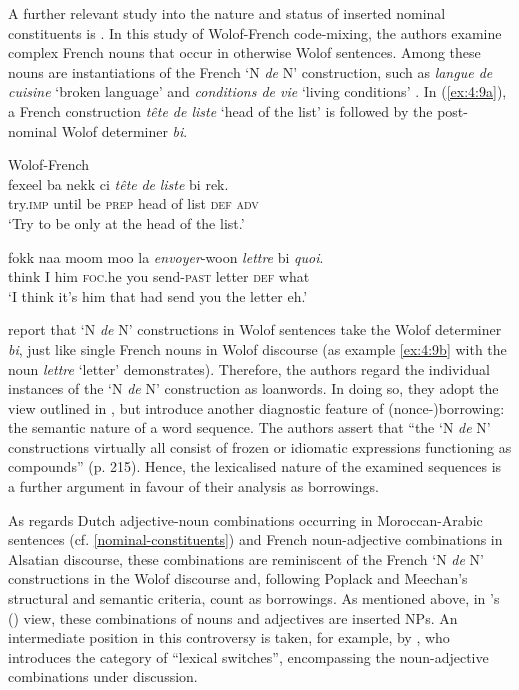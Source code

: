 A further relevant study into the nature and status of inserted nominal constituents is \citet{poplack-meechan-1995}. In this study of Wolof-French code-mixing, the authors examine complex French nouns that occur in otherwise Wolof sentences. Among these nouns are instantiations of the French `N \textit{de} N' construction, such as \textit{langue de cuisine} `broken language' and \textit{conditions de vie} `living conditions' \citep[215]{poplack-meechan-1995}. In (\ref{ex:4:9a}), a French construction \textit{tête de liste} `head of the list' is followed by the post-nominal Wolof determiner \textit{bi}.

\ea Wolof-French \citep[215, 228]{poplack-meechan-1995}\\

\ea{\label{ex:4:9a}}
\gll fexeel ba nekk ci \textit{tête} \textit{de} \textit{liste} bi rek.\\
	try.\textsc{imp} until be \textsc{prep} head of list \textsc{def} \textsc{adv}\\
\glt `Try to be only at the head of the list.' 

\ex{\label{ex:4:9b}}
\gll fokk naa moom moo la \textit{envoyer}-woon \textit{lettre} bi \textit{quoi}.\\
	think I him \textsc{foc}.he you send-\textsc{past} letter \textsc{def} what\\
\glt `I think it's him that had send you the letter eh.' 
\z

\z

\noindent \citet[215]{poplack-meechan-1995} report that `N \textit{de} N' constructions in Wolof sentences take the Wolof determiner \textit{bi}, just like single French nouns in Wolof discourse (as example \ref{ex:4:9b} with the noun \textit{lettre} `letter' demonstrates). Therefore, the authors regard the individual instances of the `N \textit{de} N' construction as loanwords. In doing so, they adopt the view outlined in \citet{sankoff-et-al-1990}, but introduce another diagnostic feature of (nonce-)borrowing: the semantic nature of a word sequence. The authors assert that ``the `N \textit{de} N' constructions virtually all consist of frozen or idiomatic expressions functioning as compounds'' (p. 215). Hence, the lexicalised nature of the examined sequences is a further argument in favour of their analysis as borrowings. 

As regards Dutch adjective-noun combinations occurring in Moroccan-Arabic sentences (cf. \ref{nominal-constituents}) and French noun-adjective combinations in Alsatian discourse, these combinations are reminiscent of the French `N \textit{de} N' constructions in the Wolof discourse and, following Poplack and Meechan's structural and semantic criteria, count as borrowings. As mentioned above, in  \citeauthor{muysken-bilingual-2000}'s (\citeyear{muysken-bilingual-2000}) view, these combinations of nouns and adjectives are inserted NPs. An intermediate position in this controversy is taken, for example, by \citet[141]{gardner-chloros-1991}, who introduces the category of “lexical switches”, encompassing the noun-adjective combinations under discussion.

